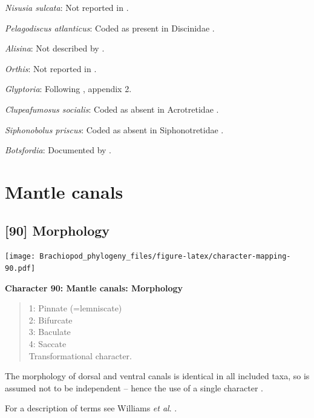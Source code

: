\documentclass[]{book}
\theoremstyle{definition}
\theoremstyle{definition}
\theoremstyle{definition}
\theoremstyle{remark}
\begin{document}
\emph{Nisusia sulcata}: Not reported in
\citet{Williams2000BrachiopodaLinguliformea}.

\emph{Pelagodiscus atlanticus}: Coded as present in Discinidae
\citep[table 6]{Williams2000BrachiopodaLinguliformea}.

\emph{Alisina}: Not described by
\citet{Williams2000BrachiopodaLinguliformea}.

\emph{Orthis}: Not reported in
\citet{Williams2000BrachiopodaLinguliformea}.

\emph{Glyptoria}: Following \citet{Williams1998Thediversity}, appendix
2.

\emph{Clupeafumosus socialis}: Coded as absent in Acrotretidae
\citep[table 6]{Williams2000BrachiopodaLinguliformea}.

\emph{Siphonobolus priscus}: Coded as absent in Siphonotretidae
\citep[table 6]{Williams2000BrachiopodaLinguliformea}.

\emph{Botsfordia}: Documented by \citet{Skovsted2017Depthrelated}.

\hypertarget{mantle-canals}{%
\section{Mantle canals}\label{mantle-canals}}

\hypertarget{morphology-1}{%
\subsection*{{[}90{]} Morphology}\label{morphology-1}}

\texttt{[image: Brachiopod\_phylogeny\_files/figure-latex/character-mapping-90.pdf]}

\textbf{Character 90: Mantle canals: Morphology}

\begin{quote}
1: Pinnate (=lemniscate)\\
2: Bifurcate\\
3: Baculate\\
4: Saccate\\
Transformational character.
\end{quote}

The morphology of dorsal and ventral canals is identical in all included
taxa, so is assumed not to be independent -- hence the use of a single
character \citep[contra][]{Williams2000BrachiopodaLinguliformea}.

For a description of terms see Williams \emph{et al}.
\citeyearpar[2000]{Williams1997BrachiopodaRevised}.
\end{document}
